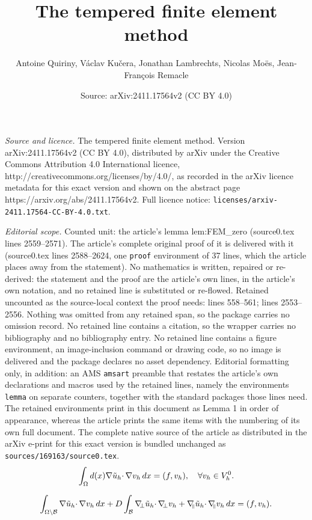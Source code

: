 \documentclass[10pt,a4paper]{amsart}
\title{The tempered finite element method}
\author{Antoine {Quiriny}, Václav {Kučera}, Jonathan {Lambrechts}, Nicolas {Moës}, Jean-François {Remacle}}
\date{Source: arXiv:2411.17564v2 (CC BY 4.0)}
\def\B{\mathcal{B}}
\def \d {{\rm d}}
\def\dx{\,\d x }
\def\gradn{\nabla_{\!\!\perp}}
\def\gradt{\nabla_{\!\!{\scriptscriptstyle\parallel}}}
\def\tu{\tilde{u}}
\begin{document}
\maketitle

\noindent\emph{Source and licence.} The tempered finite element method. Version arXiv:2411.17564v2 (CC BY 4.0), distributed by arXiv under the Creative Commons Attribution 4.0 International licence, http://creativecommons.org/licenses/by/4.0/, as recorded in the arXiv licence metadata for this exact version and shown on the abstract page https://arxiv.org/abs/2411.17564v2. Full licence notice: \texttt{licenses/arxiv-2411.17564-CC-BY-4.0.txt}.\par\smallskip

\noindent\textit{Editorial scope.} Counted unit: the article's lemma lem:FEM\_zero (source0.tex lines 2559--2571). The article's complete original proof of it is delivered with it (source0.tex lines 2588--2624, one \texttt{proof} environment of 37 lines, which the article places away from the statement). No mathematics is written, repaired or re-derived: the statement and the proof are the article's own lines, in the article's own notation, and no retained line is substituted or re-flowed.  Retained uncounted as the source-local context the proof needs: lines 558--561; lines 2553--2556.  Nothing was omitted from any retained span, so the package carries no omission record.  No retained line contains a citation, so the wrapper carries no bibliography and no bibliography entry.  No retained line contains a figure environment, an image-inclusion command or drawing code, so no image is delivered and the package declares no asset dependency.  Editorial formatting only, in addition: an AMS \texttt{amsart} preamble that restates the article's own declarations and macros used by the retained lines, namely the environments \texttt{lemma} on separate counters, together with the standard packages those lines need.  The retained environments print in this document as Lemma 1 in order of appearance, whereas the article prints the same items with the numbering of its own full document.  The complete native source of the article as distributed in the arXiv e-print for this exact version is bundled unchanged as \texttt{sources/169163/source0.tex}.
\begin{equation}
\int_\Omega d(x)\nabla \tu_h\cdotp\nabla v_h \dx=(f,v_h),\quad\forall v_h\in V_h^0.
\label{eq:FEM_mod}
\end{equation}

\begin{equation}
\label{eq:FEM_zero:3}
\int_{\Omega\setminus\B} \nabla \tu_h\cdotp\nabla v_h \dx +D\int_{\B} \gradn \tu_h \cdotp\gradn v_h +\gradt \tu_h\cdotp\gradt v_h \dx=(f,v_h).
\end{equation}
\end{document}
